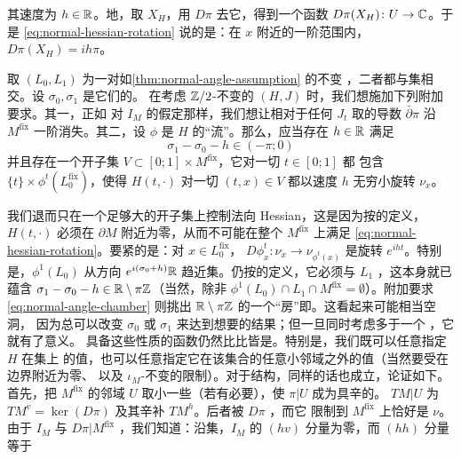 其速度为 $h\in\mathbb{R}$。\trEquivalence{}地，取\trHamiltonianVectorField{} $X_H$，用 $D\pi$
去\trProjection{}它，得到一个函数 $D\pi(X_H)\colon U\to\mathbb{C}$。于是 \eqref{eq:normal-hessian-rotation}
说的是：在 $x$ 附近的一阶范围内，$D\pi(X_H)=ih\pi$。
\begin{assumption}\label{thm:floer-datum-assumption}
取 $(L_0,L_1)$ 为一对如\cref{thm:normal-angle-assumption} 的不变\trExact\trLagrange%
\trSubmanifold，二者都与\trFixedPoint{}集相交。设 $\sigma_0,\sigma_1$ 是它们的\trNormalAngle。
在考虑 $\mathbb{Z}/2$-不变的\trFloerDatum{} $(H,J)$ 时，我们想施加下列附加要求。其一，正如
对 $I_M$ 的假定那样，我们想让相对于任何 $J_t$ 取的导数 $\bar{\partial}\pi$ 沿
$M^{\mathrm{fix}}$ 一阶消失。其二，设 $\phi$ 是 $H$ 的“流”。那么，应当存在 $h\in\mathbb{R}$
满足
\begin{equation}\label{eq:normal-angle-chamber}
\sigma_1-\sigma_0-h\in(-\pi;0)
\end{equation}
并且存在一个开子集 $V\subset[0;1]\times M^{\mathrm{fix}}$，它对一切 $t\in[0;1]$ 都
包含 $\{t\}\times\phi^t(L^{\mathrm{fix}}_0)$，使得 $H(t,\cdot)$ 对一切 $(t,x)\in V$
都以速度 $h$ 无穷小旋转 $\nu_x$。
\end{assumption}
我们退而只在一个足够大的开子集上控制法向 Hessian，这是因为按\trFloerDatum{}的定义，
$H(t,\cdot)$ 必须在 $\partial M$ 附近为零，从而不可能在整个 $M^{\mathrm{fix}}$ 上满足
\eqref{eq:normal-hessian-rotation}。要紧的是：对 $x\in L^{\mathrm{fix}}_0$，
$D\phi^t_x\colon\nu_x\to\nu_{\phi^t(x)}$ 是旋转 $e^{iht}$。特别是，$\phi^1(L_0)$ 从方向
$e^{i(\sigma_0+h)}\mathbb{R}$ 趋近\trFixedPoint{}集。仍按\trFloerDatum{}的定义，它必须与 $L_1$
\trTransverse，这本身就已蕴含 $\sigma_1-\sigma_0-h\in\mathbb{R}\setminus\pi\mathbb{Z}$（当然，除非
$\phi^1(L_0)\cap L_1\cap M^{\mathrm{fix}}=\emptyset$）。附加要求 \eqref{eq:normal-angle-chamber}
则挑出 $\mathbb{R}\setminus\pi\mathbb{Z}$ 的一个“房”即\trConnectedComponent。这看起来可能相当空洞，
因为总可以改变 $\sigma_0$ 或 $\sigma_1$ 来达到想要的结果；但一旦同时考虑多于一个%
\trFloerDatum，它就有了意义。
具备这些性质的函数仍然比比皆是。特别是，我们既可以任意指定 $H$ 在\trFixedPoint{}集上
的值，也可以任意指定它在该集合的任意小邻域之外的值（当然要受在边界附近为零、
以及 $\iota_M$-不变的限制）。对于\trAlmostComplex{}结构，同样的话也成立，论证如下。首先，把
$M^{\mathrm{fix}}$ 的邻域 $U$ 取小一些（若有必要），使 $\pi|U$ 成为具辛\trFiber{}的\trSubmersion{}。
\trTangentBundle{} $TM|U$ \trSplitting{}为 $TM^v=\ker(D\pi)$ 及其辛\trOrthogonal{}补 $TM^h$。后者被 $D\pi$ \trTrivialization{}，而它
限制到 $M^{\mathrm{fix}}$ 上恰好是 $\nu$。由于 $I_M$ 与\trTrivialization{} $D\pi|M^{\mathrm{fix}}$
\trCompatible，我们知道：沿\trFixedPoint{}集，$I_M$ 的 $(hv)$ 分量为零，而 $(hh)$ 分量等于
